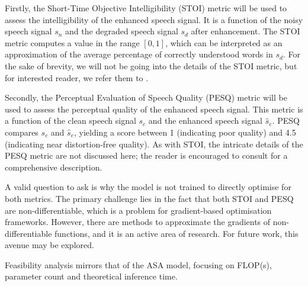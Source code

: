 \documentclass[logo,bsc,singlespacing,parskip,online]{infthesis}
\begin{document}
Firstly, the Short-Time Objective Intelligibility (STOI) \citep{taal_algorithm_2011} metric will be used to assess the intelligibility of the enhanced speech signal.
It is a function of the noisy speech signal $s_n$ and the degraded speech signal $s_d$ after enhancement.
The STOI metric computes a value in the range \([0, 1]\), which can be interpreted as an approximation of the average percentage of correctly understood words in $s_d$. 
For the sake of brevity, we will not be going into the details of the STOI metric, but for interested reader, we refer them to \citet{taal_algorithm_2011}.

Secondly, the Perceptual Evaluation of Speech Quality (PESQ) \citep{rix_perceptual_2001} metric will be 
used to assess the perceptual quality of the enhanced speech signal. 
This metric is a function of the clean speech signal $s_c$ and the enhanced speech signal $\hat{s}_e$.
PESQ compares $s_c$ and $\hat{s}_e$, yielding a score between 1 (indicating poor quality) and 4.5 (indicating near distortion-free quality). 
As with STOI, the intricate details of the PESQ metric are not discussed here; the reader is encouraged to consult \citet{rix_perceptual_2001} for a comprehensive description.

A valid question to ask is why the model is not trained to directly optimise for both metrics. The primary challenge lies in the fact that both STOI and PESQ are non-differentiable,
which is a problem for gradient-based optimisation frameworks. However, there are methods to approximate the gradients of non-differentiable functions, and it is an active area of research.
For future work, this avenue may be explored. 

Feasibility analysis mirrors that of the ASA model, focusing on FLOP(s), parameter count and theoretical inference time.
\end{document}
